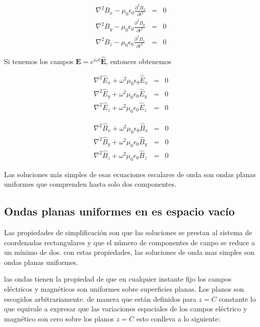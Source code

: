 \begin{eqnarray*}
\nabla^2 B_x - \mu_0 \epsilon_0 \frac{\partial^2 B_x}{\partial t^2} &=& 0 \\
\nabla^2 B_y - \mu_0 \epsilon_0 \frac{\partial^2 B_y}{\partial t^2} &=& 0 \\
\nabla^2 B_z - \mu_0 \epsilon_0 \frac{\partial^2 B_z}{\partial t^2} &=& 0 
\end{eqnarray*}

Si tenemos los campos $\mathbf{E}=e^{i \omega t}\mathbf{\hat{E}}$, entonces obtenemos

\begin{eqnarray*}
\nabla^2 \hat{E}_x + \omega^2 \mu_0 \epsilon_0 \hat{E}_x &=& 0 \\
\nabla^2 \hat{E}_y + \omega^2 \mu_0 \epsilon_0 \hat{E}_y &=& 0 \\
\nabla^2 \hat{E}_z + \omega^2 \mu_0 \epsilon_0 \hat{E}_z &=& 0
\end{eqnarray*}

\begin{eqnarray*}
\nabla^2 \hat{B}_x + \omega^2 \mu_0 \epsilon_0 \hat{B}_x &=& 0 \\
\nabla^2 \hat{B}_y + \omega^2 \mu_0 \epsilon_0 \hat{B}_y &=& 0 \\
\nabla^2 \hat{B}_z + \omega^2 \mu_0 \epsilon_0 \hat{B}_z &=& 0
\end{eqnarray*}

Las soluciones más simples de esas ecuaciones escalares de onda son ondas planas uniformes que comprenden hasta solo dos componentes.

\subsection{Ondas planas uniformes en es espacio vacío} \label{Ondas_planas_uniformes_en_es_espacio_vacio}

Las propiedades de simplificación son que las soluciones se prestan al sistema de coordenadas rectangulares y que el número de componentes de canpo se reduce a un mínimo de dos. con estas propiedades, las soluciones de onda mas simples son ondas planas uniformes.

las ondas tienen la propiedad de que en cualquier instante fijo los campos eléctricos y magnéticos son uniformes sobre superficies planas. Los planos son escogidos arbitrariamente. de manera que están definidos para $z=C$ constante lo que equivale a expresar que las variaciones espaciales de los campos eléctrico y magnético son cero sobre los planos $z=C$ esto conlleva a lo siguiente:

